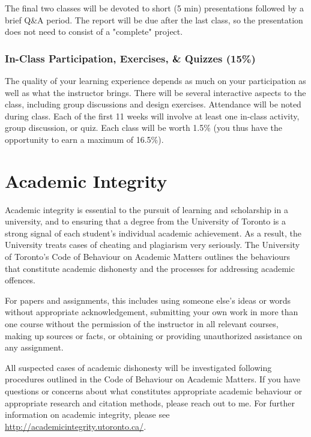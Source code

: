 \documentclass[11pt]{article}
\begin{document}
	The final two classes will be devoted to short (5 min) presentations followed by a brief Q\&A period. The report will be due after the last class, so the presentation does not need to consist of a "complete" project.
	
	
	
	\subsubsection*{In-Class Participation, Exercises, \& Quizzes (15\%)}
	
	The quality of your learning experience depends as much on your participation as well as what the instructor brings. There will be several interactive aspects to the class, including group discussions and design exercises. Attendance will be noted during class. Each of the first 11 weeks will involve at least one in-class activity, group discussion, or quiz. Each class will be worth 1.5\% (you thus have the opportunity to earn a maximum of 16.5\%).
	
	
	
	
	
	\section*{Academic Integrity}
	
	Academic integrity is essential to the pursuit of learning and scholarship in a university, and to ensuring that a degree from the University of Toronto is a strong signal of each student’s individual academic achievement. As a result, the University treats cases of cheating and plagiarism very seriously. The University of Toronto's Code of Behaviour on Academic Matters outlines the behaviours that constitute academic dishonesty and the processes for addressing academic offences. 
	
	For papers and assignments, this includes using someone else's ideas or words without appropriate acknowledgement, submitting your own work in more than one course without the permission of the instructor in all relevant courses,	making up sources or facts, or obtaining or providing unauthorized assistance on any assignment.
	
	All suspected cases of academic dishonesty will be investigated following procedures outlined in the Code of Behaviour on Academic Matters. If you have questions or concerns about what constitutes appropriate academic behaviour or appropriate research and citation methods, please reach out to me. For further information on academic integrity, please see \url{http://academicintegrity.utoronto.ca/}.
	
\end{document}
